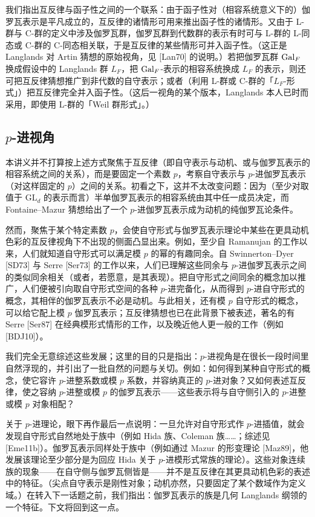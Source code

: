 我们指出互反律与函子性之间的一个联系：由于函子性对（相容系统意义下的）伽罗瓦表示是平凡成立的，互反律的诸情形可用来推出函子性的诸情形。又由于 L-群与 C-群的定义中涉及伽罗瓦群，伽罗瓦群到代数群的表示有时可与 L-群的 L-同态或 C-群的 C-同态相关联，于是互反律的某些情形可并入函子性。（这正是 Langlands 对 Artin 猜想的原始视角，见 [Lan70] 的说明。）若把伽罗瓦群 $\operatorname{Gal}_F$ 换成假设中的 Langlands 群 $L_F$，把 $\operatorname{Gal}_F$-表示的相容系统换成 $L_F$ 的表示，则还可把互反律猜想推广到非代数的自守表示；或者（利用 L-群或 C-群的「$L_F$-形式」）把互反律完全并入函子性。（这后一视角的某个版本，Langlands 本人已时而采用，即使用 L-群的「Weil 群形式」。）

\subsection{$p$-进视角}

本讲义并不打算按上述方式聚焦于互反律（即自守表示与动机、或与伽罗瓦表示的相容系统之间的关系），而是要固定一个素数 $p$，考察自守表示与 $p$-进伽罗瓦表示（对这样固定的 $p$）之间的关系。初看之下，这并不太改变问题：因为（至少对取值于 $\mathrm{GL}_d$ 的表示而言）半单伽罗瓦表示的相容系统由其中任一成员决定，而 Fontaine--Mazur 猜想给出了一个 $p$-进伽罗瓦表示成为动机的纯伽罗瓦论条件。

然而，聚焦于某个特定素数 $p$，会使自守形式与伽罗瓦表示理论中某些在更具动机色彩的互反律视角下不出现的侧面凸显出来。例如，至少自 Ramanujan 的工作以来，人们就知道自守形式可以满足模 $p$ 的幂的有趣同余。自 Swinnerton--Dyer [SD73] 与 Serre [Ser73] 的工作以来，人们已理解这些同余与 $p$-进伽罗瓦表示之间的类似同余相关（或者，若愿意，是其表现）。把自守形式之间同余的概念加以推广，人们便被引向取自守形式空间的各种 $p$-进完备化，从而得到 $p$-进自守形式的概念，其相伴的伽罗瓦表示不必是动机。与此相关，还有模 $p$ 自守形式的概念，可以给它配上模 $p$ 伽罗瓦表示；互反律猜想也已在此背景下被表述，著名的有 Serre [Ser87] 在经典模形式情形的工作，以及晚近他人更一般的工作（例如 [BDJ10]）。

我们完全无意综述这些发展；这里的目的只是指出：$p$-进视角是在很长一段时间里自然浮现的，并引出了一批自然的问题与关切。例如：如何得到某种自守形式的概念，使它容许 $p$-进整系数或模 $p$ 系数，并容纳真正的 $p$-进对象？又如何表述互反律，使之容纳 $p$-进整或模 $p$ 的伽罗瓦表示——这些表示将与自守侧引入的 $p$-进整或模 $p$ 对象相配？

关于 $p$-进理论，眼下再作最后一点说明：一旦允许对自守形式作 $p$-进插值，就会发现自守形式自然地处于族中（例如 Hida 族、Coleman 族……；综述见 [Eme11b]）。伽罗瓦表示同样处于族中（例如通过 Mazur 的形变理论 [Maz89]，他发展该理论至少部分是为回应 Hida 关于 $p$-进模形式常族的理论）。这些对象连续族的现象——在自守侧与伽罗瓦侧皆是——并不是互反律在其更具动机色彩的表述中的特征。（尖点自守表示是刚性对象；动机亦然，只要固定了某个数域作为定义域。）在转入下一话题之前，我们指出：伽罗瓦表示的族是几何 Langlands 纲领的一个特征。下文将回到这一点。

